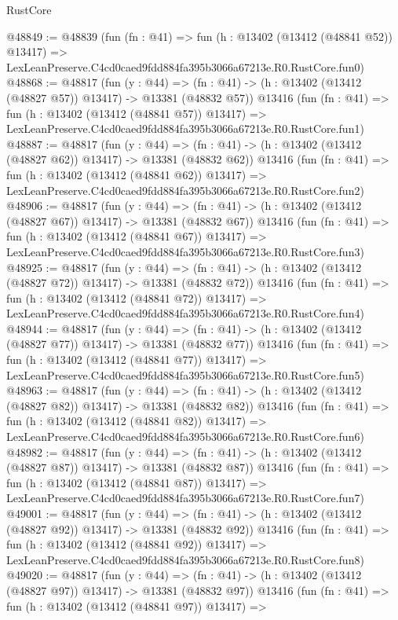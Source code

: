\begin{lexlean}{RustCore}
\begin{coremodule}
@48849 := @48839
    (fun (fn : @41) =>
    fun (h : @13402 (@13412 (@48841 @52)) @13417) =>
    LexLeanPreserve.C4cd0caed9fdd884fa395b3066a67213e.R0.RustCore.fun0)
@48868 := @48817
    (fun (y : @44) =>
    (fn : @41) -> (h : @13402 (@13412 (@48827 @57)) @13417) -> @13381 (@48832 @57))
    @13416
    (fun (fn : @41) =>
    fun (h : @13402 (@13412 (@48841 @57)) @13417) =>
    LexLeanPreserve.C4cd0caed9fdd884fa395b3066a67213e.R0.RustCore.fun1)
@48887 := @48817
    (fun (y : @44) =>
    (fn : @41) -> (h : @13402 (@13412 (@48827 @62)) @13417) -> @13381 (@48832 @62))
    @13416
    (fun (fn : @41) =>
    fun (h : @13402 (@13412 (@48841 @62)) @13417) =>
    LexLeanPreserve.C4cd0caed9fdd884fa395b3066a67213e.R0.RustCore.fun2)
@48906 := @48817
    (fun (y : @44) =>
    (fn : @41) -> (h : @13402 (@13412 (@48827 @67)) @13417) -> @13381 (@48832 @67))
    @13416
    (fun (fn : @41) =>
    fun (h : @13402 (@13412 (@48841 @67)) @13417) =>
    LexLeanPreserve.C4cd0caed9fdd884fa395b3066a67213e.R0.RustCore.fun3)
@48925 := @48817
    (fun (y : @44) =>
    (fn : @41) -> (h : @13402 (@13412 (@48827 @72)) @13417) -> @13381 (@48832 @72))
    @13416
    (fun (fn : @41) =>
    fun (h : @13402 (@13412 (@48841 @72)) @13417) =>
    LexLeanPreserve.C4cd0caed9fdd884fa395b3066a67213e.R0.RustCore.fun4)
@48944 := @48817
    (fun (y : @44) =>
    (fn : @41) -> (h : @13402 (@13412 (@48827 @77)) @13417) -> @13381 (@48832 @77))
    @13416
    (fun (fn : @41) =>
    fun (h : @13402 (@13412 (@48841 @77)) @13417) =>
    LexLeanPreserve.C4cd0caed9fdd884fa395b3066a67213e.R0.RustCore.fun5)
@48963 := @48817
    (fun (y : @44) =>
    (fn : @41) -> (h : @13402 (@13412 (@48827 @82)) @13417) -> @13381 (@48832 @82))
    @13416
    (fun (fn : @41) =>
    fun (h : @13402 (@13412 (@48841 @82)) @13417) =>
    LexLeanPreserve.C4cd0caed9fdd884fa395b3066a67213e.R0.RustCore.fun6)
@48982 := @48817
    (fun (y : @44) =>
    (fn : @41) -> (h : @13402 (@13412 (@48827 @87)) @13417) -> @13381 (@48832 @87))
    @13416
    (fun (fn : @41) =>
    fun (h : @13402 (@13412 (@48841 @87)) @13417) =>
    LexLeanPreserve.C4cd0caed9fdd884fa395b3066a67213e.R0.RustCore.fun7)
@49001 := @48817
    (fun (y : @44) =>
    (fn : @41) -> (h : @13402 (@13412 (@48827 @92)) @13417) -> @13381 (@48832 @92))
    @13416
    (fun (fn : @41) =>
    fun (h : @13402 (@13412 (@48841 @92)) @13417) =>
    LexLeanPreserve.C4cd0caed9fdd884fa395b3066a67213e.R0.RustCore.fun8)
@49020 := @48817
    (fun (y : @44) =>
    (fn : @41) -> (h : @13402 (@13412 (@48827 @97)) @13417) -> @13381 (@48832 @97))
    @13416
    (fun (fn : @41) =>
    fun (h : @13402 (@13412 (@48841 @97)) @13417) =>

\end{coremodule}
\end{lexlean}
